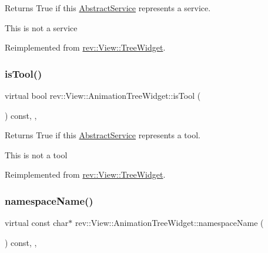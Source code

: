 Returns True if this \mbox{\hyperlink{classrev_1_1_abstract_service}{Abstract\+Service}} represents a service. 

This is not a service 

Reimplemented from \mbox{\hyperlink{classrev_1_1_view_1_1_tree_widget_a9f10e939850acf8fce1992b5b9b3fc24}{rev\+::\+View\+::\+Tree\+Widget}}.

\mbox{\label{classrev_1_1_view_1_1_animation_tree_widget_a5608e3ec9dd33d9b9f3ae0da8bf41bea}} 
\subsubsection{\texorpdfstring{isTool()}{isTool()}}
{\footnotesize\ttfamily virtual bool rev\+::\+View\+::\+Animation\+Tree\+Widget\+::is\+Tool (\begin{DoxyParamCaption}{ }\end{DoxyParamCaption}) const\hspace{0.3cm}{\ttfamily [inline]}, {\ttfamily [override]}, {\ttfamily [virtual]}}



Returns True if this \mbox{\hyperlink{classrev_1_1_abstract_service}{Abstract\+Service}} represents a tool. 

This is not a tool 

Reimplemented from \mbox{\hyperlink{classrev_1_1_view_1_1_tree_widget_a7ff55c9e8c83c70e9331a7fe7acafbb6}{rev\+::\+View\+::\+Tree\+Widget}}.

\mbox{\label{classrev_1_1_view_1_1_animation_tree_widget_a7e4693a9bee6d2ed28da121609ac82ec}} 
\subsubsection{\texorpdfstring{namespaceName()}{namespaceName()}}
{\footnotesize\ttfamily virtual const char$\ast$ rev\+::\+View\+::\+Animation\+Tree\+Widget\+::namespace\+Name (\begin{DoxyParamCaption}{ }\end{DoxyParamCaption}) const\hspace{0.3cm}{\ttfamily [inline]}, {\ttfamily [override]}, {\ttfamily [virtual]}}



